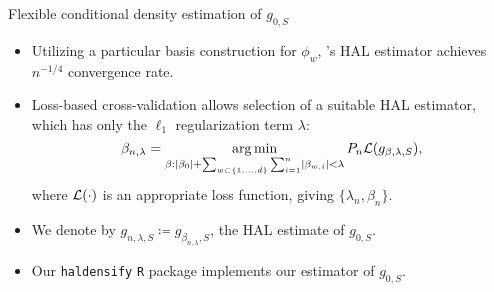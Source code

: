 \documentclass{beamer}
\begin{document}
\begin{frame}[c]{Flexible conditional density estimation of $g_{0,S}$}

\begin{center}
\begin{itemize}
  \itemsep8pt
  \item Utilizing a particular basis construction for $\phi_w$,
    \citet{vdl2017generally}'s HAL estimator achieves $n^{-1/4}$
    convergence rate\footnotemark.
  \item Loss-based cross-validation allows selection of a suitable HAL
    estimator, which has only the $\ell_1$ regularization term $\lambda$:
    {\small{
    \begin{equation*}
      \beta_{n, \lambda}= \operatorname*{arg\,min}_{\beta: \lvert \beta_0 \rvert + \sum_{w
        \subset\{1,\ldots,d\}} \sum_{i=1}^{n} \lvert \beta_{w,i} \rvert <
        \lambda} P_n \mathcal{L}(g_{\beta,\lambda,S}),
    \end{equation*} }
    }
    where $\mathcal{L}(\cdot)$ is an appropriate loss function, giving
    $\{\lambda_n, \beta_n\}$.
  \item We denote by $g_{n,\lambda,S} \coloneqq g_{\beta_{n, \lambda},S}$, the
    HAL estimate of $g_{0,S}$.
  \item Our \texttt{haldensify} \texttt{R} package implements our estimator of
    $g_{0,S}$.
\end{itemize}
\end{center}



\end{frame}

\end{document}
